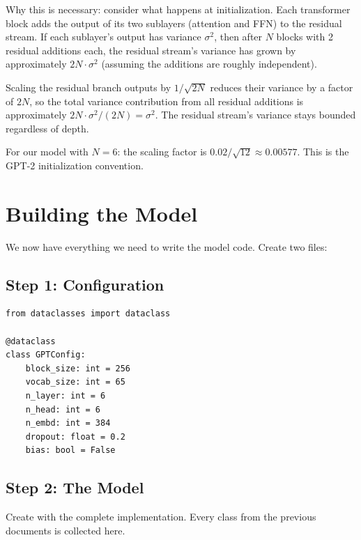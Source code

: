 Why this is necessary: consider what happens at initialization. Each transformer block adds the output of its two sublayers (attention and FFN) to the residual stream. If each sublayer's output has variance $\sigma^2$, then after $N$ blocks with 2 residual additions each, the residual stream's variance has grown by approximately $2N \cdot \sigma^2$ (assuming the additions are roughly independent).

Scaling the residual branch outputs by $1/\sqrt{2N}$ reduces their variance by a factor of $2N$, so the total variance contribution from all residual additions is approximately $2N \cdot \sigma^2 / (2N) = \sigma^2$. The residual stream's variance stays bounded regardless of depth.

For our model with $N = 6$: the scaling factor is $0.02 / \sqrt{12} \approx 0.00577$. This is the GPT-2 initialization convention.

\section{Building the Model}

We now have everything we need to write the model code. Create two files:

\subsection{Step 1: Configuration}

\begin{lstlisting}
from dataclasses import dataclass

@dataclass
class GPTConfig:
    block_size: int = 256
    vocab_size: int = 65
    n_layer: int = 6
    n_head: int = 6
    n_embd: int = 384
    dropout: float = 0.2
    bias: bool = False
\end{lstlisting}

\subsection{Step 2: The Model}

Create  with the complete implementation. Every class from the previous documents is collected here.

